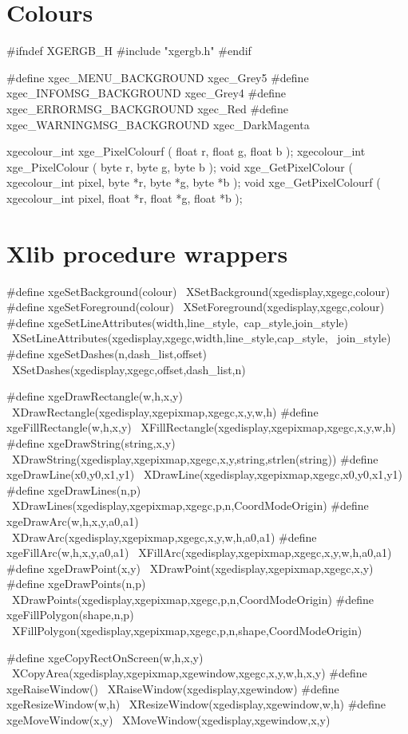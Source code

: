 \section{Colours}

\begin{listingC}
#ifndef XGERGB_H
#include "xgergb.h"
#endif

#define xgec_MENU_BACKGROUND       xgec_Grey5
#define xgec_INFOMSG_BACKGROUND    xgec_Grey4
#define xgec_ERRORMSG_BACKGROUND   xgec_Red
#define xgec_WARNINGMSG_BACKGROUND xgec_DarkMagenta
\end{listingC}

\begin{listingC}
xgecolour_int xge_PixelColourf ( float r, float g, float b );
xgecolour_int xge_PixelColour ( byte r, byte g, byte b );
void xge_GetPixelColour ( xgecolour_int pixel,
                          byte *r, byte *g, byte *b );
void xge_GetPixelColourf ( xgecolour_int pixel,
                           float *r, float *g, float *b );
\end{listingC}


\section{Xlib procedure wrappers}

\begin{listingC}
#define xgeSetBackground(colour) \
  XSetBackground(xgedisplay,xgegc,colour)
#define xgeSetForeground(colour) \
  XSetForeground(xgedisplay,xgegc,colour)
#define xgeSetLineAttributes(width,line_style,\
    cap_style,join_style) \
  XSetLineAttributes(xgedisplay,xgegc,width,line_style,cap_style, \
    join_style)
#define xgeSetDashes(n,dash_list,offset) \
  XSetDashes(xgedisplay,xgegc,offset,dash_list,n)

#define xgeDrawRectangle(w,h,x,y) \
  XDrawRectangle(xgedisplay,xgepixmap,xgegc,x,y,w,h)
#define xgeFillRectangle(w,h,x,y) \
  XFillRectangle(xgedisplay,xgepixmap,xgegc,x,y,w,h)
#define xgeDrawString(string,x,y) \
  XDrawString(xgedisplay,xgepixmap,xgegc,x,y,string,strlen(string))
#define xgeDrawLine(x0,y0,x1,y1) \
  XDrawLine(xgedisplay,xgepixmap,xgegc,x0,y0,x1,y1)
#define xgeDrawLines(n,p) \
  XDrawLines(xgedisplay,xgepixmap,xgegc,p,n,CoordModeOrigin)
#define xgeDrawArc(w,h,x,y,a0,a1) \
  XDrawArc(xgedisplay,xgepixmap,xgegc,x,y,w,h,a0,a1)
#define xgeFillArc(w,h,x,y,a0,a1) \
  XFillArc(xgedisplay,xgepixmap,xgegc,x,y,w,h,a0,a1)
#define xgeDrawPoint(x,y) \
  XDrawPoint(xgedisplay,xgepixmap,xgegc,x,y)
#define xgeDrawPoints(n,p) \
  XDrawPoints(xgedisplay,xgepixmap,xgegc,p,n,CoordModeOrigin)
#define xgeFillPolygon(shape,n,p) \
  XFillPolygon(xgedisplay,xgepixmap,xgegc,p,n,shape,CoordModeOrigin)

#define xgeCopyRectOnScreen(w,h,x,y) \
  XCopyArea(xgedisplay,xgepixmap,xgewindow,xgegc,x,y,w,h,x,y)
#define xgeRaiseWindow() \
  XRaiseWindow(xgedisplay,xgewindow)
#define xgeResizeWindow(w,h) \
  XResizeWindow(xgedisplay,xgewindow,w,h)
#define xgeMoveWindow(x,y) \
  XMoveWindow(xgedisplay,xgewindow,x,y)
\end{listingC}

